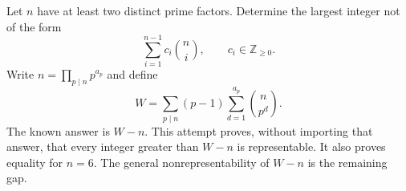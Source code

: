 Let $n$ have at least two distinct prime factors. Determine the largest integer not of the form
\[\sum_{i=1}^{n-1}c_i\binom ni,\qquad c_i\in\mathbb Z_{\ge0}.
\]
Write $n=\prod_{p\mid n}p^{a_p}$ and define
\[W=\sum_{p\mid n}(p-1)\sum_{d=1}^{a_p}\binom n{p^d}.
\]
The known answer is $W-n$. This attempt proves, without importing that answer, that every integer greater than $W-n$ is representable. It also proves equality for $n=6$. The general nonrepresentability of $W-n$ is the remaining gap.
